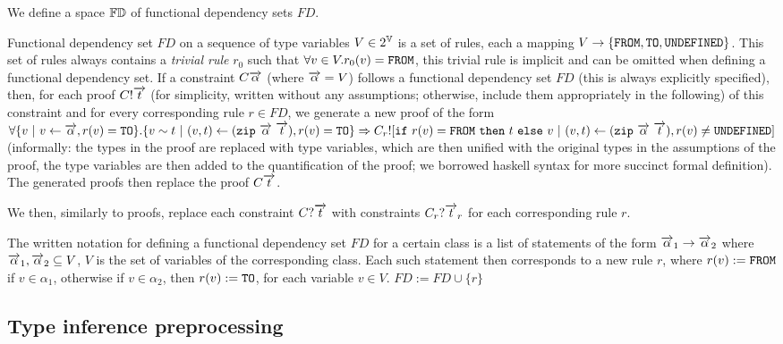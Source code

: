 \begin{defn}
    We define a space $\mathbb{FD}$ of functional dependency sets $FD$.

    Functional dependency set $FD$ on a sequence of type variables $V \in 2^{\mathbb{V}}$ is a set of rules, each a mapping $V \to \{\mathtt{FROM}, \mathtt{TO}, \mathtt{UNDEFINED}\}$. This set of rules always contains a \emph{trivial rule} $r_0$ such that $\forall v \in V . r_0(v) = \mathtt{FROM}$, this trivial rule is implicit and can be omitted when defining a functional dependency set. If a constraint $C \overrightarrow{\alpha}$ (where $\overrightarrow{\alpha} = V$) follows a functional dependency set $FD$ (this is always explicitly specified), then, for each proof $C! \overrightarrow{t}$ (for simplicity, written without any assumptions; otherwise, include them appropriately in the following) of this constraint and for every corresponding rule $r \in FD$, we generate a new proof of the form $\forall \{v \ |\  v \gets \overrightarrow{\alpha}, r(v) = \mathtt{TO}\} . \{v \sim t \ |\  (v, t) \gets (\mathtt{zip}\ \overrightarrow{\alpha}\ \overrightarrow{t}), r(v) = \mathtt{TO} \} \Rightarrow C_r! [\mathtt{if}\ r(v) = \mathtt{FROM}\ \mathtt{then}\ t\ \mathtt{else}\ v \ |\  (v, t) \gets (\mathtt{zip}\ \overrightarrow{\alpha}\ \overrightarrow{t}), r(v) \neq \mathtt{UNDEFINED}]$ (informally: the  types in the proof are replaced with type variables, which are then unified with the original types in the assumptions of the proof, the type variables are then added to the quantification of the proof; we borrowed haskell syntax for more succinct formal definition). The generated proofs then replace the proof $C \overrightarrow{t}$.

    We then, similarly to proofs, replace each constraint $C? \overrightarrow{t}$ with constraints $C_r? \overrightarrow{t}_r$ for each corresponding rule $r$.

    The written notation for defining a functional dependency set $FD$ for a certain class is a list of statements of the form $\overrightarrow{\alpha}_1 \to \overrightarrow{\alpha}_2$ where $\overrightarrow{\alpha}_1, \overrightarrow{\alpha}_2 \subseteq V$, $V$ is the set of variables of the corresponding class. Each such statement then corresponds to a new rule $r$, where $r(v) := \mathtt{FROM}$ if $v \in \alpha_1$, otherwise if $v \in \alpha_2$, then $r(v) := \mathtt{TO}$, for each variable $v \in V$. $FD := FD \cup \{r\}$
\end{defn}

\subsection{Type inference preprocessing}
\label{preprocessing}

